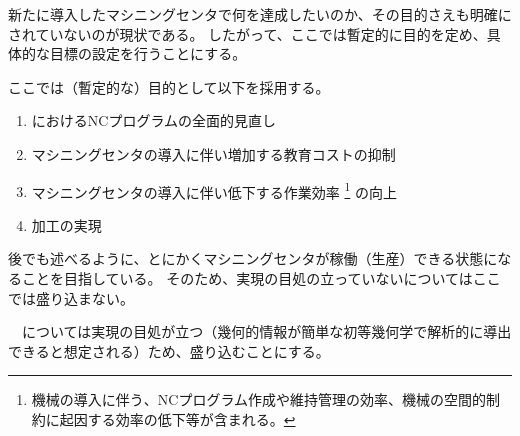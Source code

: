 

新たに導入したマシニングセンタで何を達成したいのか、その目的さえも明確にされていないのが現状である。
したがって、ここでは暫定的に目的を定め、具体的な目標の設定を行うことにする。



ここでは（暫定的な）目的として以下を採用する。
\begin{enumerate}[label=\sarrow]
\item \MMC におけるNCプログラムの全面的見直し
\item マシニングセンタの導入に伴い増加する教育コストの抑制
\item マシニングセンタの導入に伴い低下する作業効率%
\footnote{機械の導入に伴う、NCプログラム作成や維持管理の効率、機械の空間的制約に起因する効率の低下等が含まれる。}
の向上
\item \Dimple 加工の実現
\end{enumerate}
\begin{hosoku}
後でも述べるように、とにかくマシニングセンタが稼働（生産）できる状態になることを目指している。
そのため、実現の目処の立っていない\ReliefGrooveMilling についてはここでは盛り込まない。

　\Dimple については実現の目処が立つ（幾何的情報が簡単な初等幾何学で解析的に導出できると想定される）ため、盛り込むことにする。
\end{hosoku}


\clearpage


